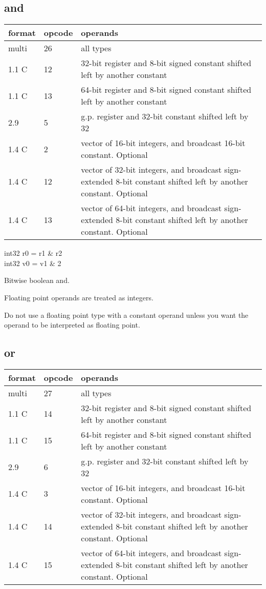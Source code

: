 \documentclass[forwardcom.tex]{subfiles}
\begin{document}
\subsection{and}
\label{table:andInstruction}
\begin{tabular}{|p{12mm}|p{15mm}|p{100mm}|}
\hline
\bfseries format & \bfseries opcode & \bfseries operands \\ \hline
multi & 26 & all types \\ \hline
1.1 C & 12 & 32-bit register and 8-bit signed constant shifted left by another constant \\ \hline
1.1 C & 13 & 64-bit register and 8-bit signed constant shifted left by another constant \\ \hline
2.9   &  5 & g.p. register and 32-bit constant shifted left by 32 \\ \hline
1.4 C &  2 & vector of 16-bit integers, and broadcast 16-bit constant. Optional \\ \hline
1.4 C & 12 & vector of 32-bit integers, and broadcast sign-extended 8-bit constant shifted left by another constant. Optional \\ \hline
1.4 C & 13 & vector of 64-bit integers, and broadcast sign-extended 8-bit constant shifted left by another constant. Optional \\ \hline
\end{tabular}
\vv

int32 r0 = r1 \& r2 \\
int32 v0 = v1 \& 2
\vv

Bitwise boolean and.
\vv

Floating point operands are treated as integers.

Do not use a floating point type with a constant operand unless you want the operand to be interpreted as floating point.
\vv

\subsection{or}
\label{table:orInstruction}
\begin{tabular}{|p{12mm}|p{12mm}|p{110mm}|}
\hline
\bfseries format & \bfseries opcode & \bfseries operands \\ \hline
multi & 27 & all types \\ \hline
1.1 C & 14 & 32-bit register and 8-bit signed constant shifted left by another constant \\ \hline
1.1 C & 15 & 64-bit register and 8-bit signed constant shifted left by another constant \\ \hline
2.9   &  6 & g.p. register and 32-bit constant shifted left by 32 \\ \hline
1.4 C &  3 & vector of 16-bit integers, and broadcast 16-bit constant. Optional \\ \hline
1.4 C & 14 & vector of 32-bit integers, and broadcast sign-extended 8-bit constant shifted left by another constant. Optional \\ \hline
1.4 C & 15 & vector of 64-bit integers, and broadcast sign-extended 8-bit constant shifted left by another constant. Optional \\ \hline
\end{tabular}
\vv
\end{document}
